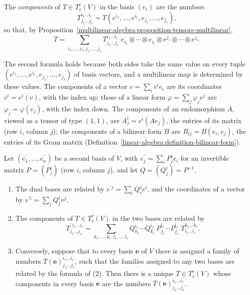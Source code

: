 \begin{definition}\label{multilinear-algebra:definition-tensor-components}
The \emph{components} of $T \in T^r_s(V)$ in the basis $(e_i)$ are the numbers
\[
T^{i_1 \ldots i_r}_{j_1 \ldots j_s} = T(e^{i_1}, \ldots, e^{i_r}, e_{j_1}, \ldots, e_{j_s}),
\]
so that, by Proposition~\ref{multilinear-algebra:proposition-tensors-multilinear},
\[
T = \sum_{i_1, \ldots, i_r, j_1, \ldots, j_s} T^{i_1 \ldots i_r}_{j_1 \ldots j_s}\; e_{i_1} \otimes \cdots \otimes e_{i_r} \otimes e^{j_1} \otimes \cdots \otimes e^{j_s}.
\]
\end{definition}

The second formula holds because both sides take the same value on every tuple $(e^{i_1}, \ldots, e^{i_r}, e_{j_1}, \ldots, e_{j_s})$ of basis vectors, and a multilinear map is
determined by these values. The components of a vector $v = \sum_iv^ie_i$ are its coordinates $v^i = e^i(v)$, with the index up; those of a linear form
$\varphi = \sum_j\varphi_je^j$ are $\varphi_j = \varphi(e_j)$, with the index down. The components of an endomorphism $A$, viewed as a tensor of type $(1,1)$, are
$A^i_j = e^i(Ae_j)$, the entries of its matrix (row $i$, column $j$); the components of a bilinear form $B$ are $B_{ij} = B(e_i, e_j)$, the entries of its Gram matrix
(Definition~\ref{linear-algebra:definition-bilinear-form}).

\begin{proposition}\label{multilinear-algebra:proposition-tensor-transformation}
Let $(e^{\prime}_1, \ldots, e^{\prime}_n)$ be a second basis of $V$, with $e^{\prime}_j = \sum_iP^i_je_i$ for an invertible matrix $P = (P^i_j)$ (row $i$, column $j$), and let
$Q = (Q^i_j) = P^{-1}$.
\begin{enumerate}
\item The dual bases are related by $e^{\prime j} = \sum_iQ^j_ie^i$, and the coordinates of a vector by $v^{\prime i} = \sum_jQ^i_jv^j$.
\item The components of $T \in T^r_s(V)$ in the two bases are related by
\[
T^{\prime\, i_1 \ldots i_r}_{j_1 \ldots j_s} = \sum_{k_1, \ldots, k_r, l_1, \ldots, l_s} Q^{i_1}_{k_1} \cdots Q^{i_r}_{k_r}\, P^{l_1}_{j_1} \cdots P^{l_s}_{j_s}\; T^{k_1 \ldots k_r}_{l_1 \ldots l_s}.
\]
\item Conversely, suppose that to every basis $\mathbf{e}$ of $V$ there is assigned a family of numbers $T(\mathbf{e})^{i_1 \ldots i_r}_{j_1 \ldots j_s}$, such that the families
assigned to any two bases are related by the formula of (2). Then there is a unique $T \in T^r_s(V)$ whose components in every basis $\mathbf{e}$ are the numbers
$T(\mathbf{e})^{i_1 \ldots i_r}_{j_1 \ldots j_s}$.
\end{enumerate}
\end{proposition}

